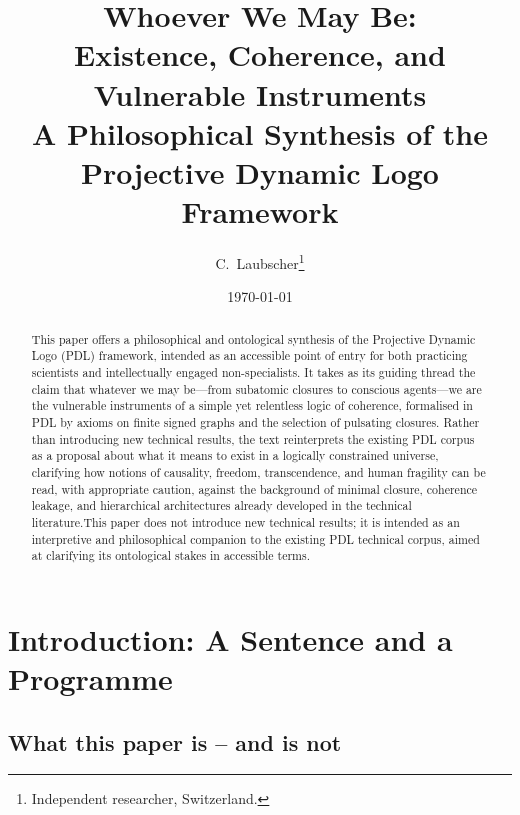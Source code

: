 \documentclass[11pt,a4paper]{article}
\theoremstyle{definition}
\begin{document}
\title{Whoever We May Be:\\[4pt]
Existence, Coherence, and Vulnerable Instruments\\[4pt]
A Philosophical Synthesis of the Projective Dynamic Logo Framework}

\author{C.~Laubscher\thanks{Independent researcher, Switzerland.}\\[4pt]}

\date{\small \today}

\maketitle

\begin{abstract}
This paper offers a philosophical and ontological synthesis of the Projective Dynamic Logo (PDL) framework, intended as an accessible point of entry for both practicing scientists and intellectually engaged non-specialists. It takes as its guiding thread the claim that whatever we may be---from subatomic closures to conscious agents---we are the vulnerable instruments of a simple yet relentless logic of coherence, formalised in PDL by axioms on finite signed graphs and the selection of pulsating closures. Rather than introducing new technical results, the text reinterprets the existing PDL corpus as a proposal about what it means to exist in a logically constrained universe, clarifying how notions of causality, freedom, transcendence, and human fragility can be read, with appropriate caution, against the background of minimal closure, coherence leakage, and hierarchical architectures already developed in the technical literature.This paper does not introduce new technical results; it is intended as an interpretive and philosophical companion to the existing PDL technical corpus, aimed at clarifying its ontological stakes in accessible terms.

\end{abstract}

\tableofcontents

\section{Introduction: A Sentence and a Programme}
\label{sec:intro} 

\subsection*{What this paper is -- and is not}
\end{document}
